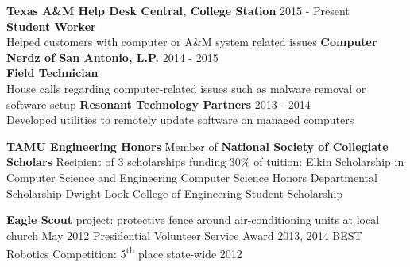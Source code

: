 \documentclass[12pt]{article}
\begin{document}
\begin{flushleft}
\begin{outline}[compactitem]
  \1 \textbf{Texas A\&M Help Desk Central, College Station} \hfill 2015 - Present
    \\ \textbf{Student Worker}
    \\ Helped customers with computer or A\&M system related issues
  \1 \textbf{Computer Nerdz of San Antonio, L.P.} \hfill 2014 - 2015
    \\ \textbf{Field Technician}
    \\ House calls regarding computer-related issues such as malware removal or software setup
  \1 \textbf{Resonant Technology Partners} \hfill 2013 - 2014
    \\ Developed utilities to remotely update software on managed computers

  \1 \textbf{TAMU Engineering Honors}
  \1 Member of \textbf{National Society of Collegiate Scholars}
  \1 Recipient of 3 scholarships funding 30\% of tuition:
    Elkin Scholarship in Computer Science and Engineering
    \space
    Computer Science Honors Departmental Scholarship
    \space
    Dwight Look College of Engineering Student Scholarship

  \1 \textbf{Eagle Scout} project: protective fence around air-conditioning units at local church \hfill May 2012
  \1 Presidential Volunteer Service Award \hfill 2013, 2014
  \1 BEST Robotics Competition: 5\textsuperscript{th} place state-wide \hfill 2012 \hfill

\end{outline}
\end{flushleft}
\end{document}

